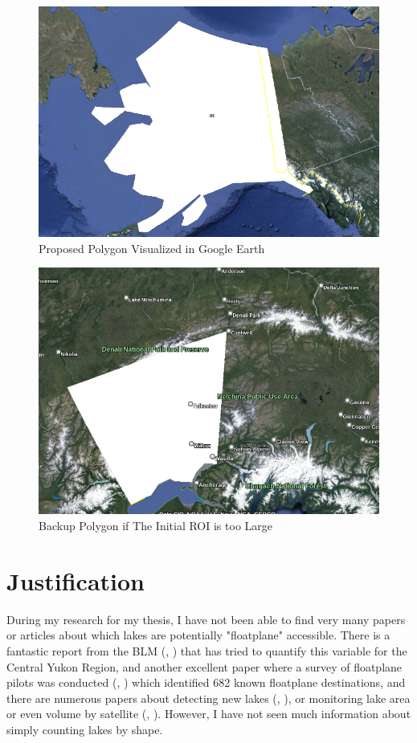 \documentclass[
    ngerman,american
    ]{scrartcl}
\renewcommand{\cite}[1]{ (\citeauthor{#1}, \citeyear{#1})}
\begin{document}
            \begin{figure}
                \centering
                \includegraphics[width=0.75\linewidth]{polyimage.png}
                \caption{Proposed Polygon Visualized in Google Earth}
                \label{fig:akpoly}
            \end{figure}

            \begin{figure}
                \centering
                \includegraphics[width=0.75\linewidth]{susitnaroi.png}
                \caption{Backup Polygon if The Initial ROI is too Large}
                \label{fig:susitna}
            \end{figure}
            

        \section{Justification}

            During my research for my thesis, I have not been able to find very many papers or articles about which lakes are potentially "floatplane" accessible.  There is a fantastic report from the BLM \cite{trammel2016} that has tried to quantify this variable for the Central Yukon Region, and another excellent paper where a survey of floatplane pilots was conducted \cite{schwoerer2022flight} which identified 682 known floatplane destinations, and there are numerous papers about detecting new lakes \cite{zhang2014lakes}, or monitoring lake area or even volume by satellite \cite{sima2013using}.  However, I have not seen much information about simply counting lakes by shape.
\end{document}
